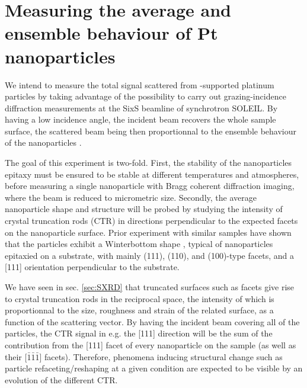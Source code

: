 \section{Measuring the average and ensemble behaviour of Pt nanoparticles}


We intend to measure the total signal scattered from -supported platinum particles by taking advantage of the possibility to carry out grazing-incidence diffraction measurements at the SixS beamline of synchrotron SOLEIL.
By having a low incidence angle, the incident beam recovers the whole sample surface, the scattered beam being then proportionnal to the ensemble behaviour of the nanoparticles \parencite{Nolte2008, Hejral2013}.

The goal of this experiment is two-fold.
First, the stability of the nanoparticles epitaxy must be ensured to be stable at different temperatures and atmospheres, before measuring a single nanoparticle with Bragg coherent diffraction imaging, where the beam is reduced to micrometric size.
Secondly, the average nanoparticle shape and structure will be probed by studying the intensity of crystal truncation rods (CTR) in directions perpendicular to the expected facets on the nanoparticle surface.
Prior experiment with similar samples \parencite{Dupraz2017, Li2020, Lim2021, Dupraz2022} have shown that the particles exhibit a Winterbottom shape \parencite{WINTERBOTTOM1967, Boukouvala2021}, typical of nanoparticles epitaxied on a substrate, with mainly (111), (110), and (100)-type facets, and a [111] orientation perpendicular to the substrate.

We have seen in sec. \ref{sec:SXRD} that truncated surfaces such as facets give rise to crystal truncation rods in the reciprocal space, the intensity of which is proportionnal to the size, roughness and strain of the related surface, as a function of the scattering vector.
By having the incident beam covering all of the particles, the CTR signal in e.g. the [111] direction will be the sum of the contribution from the [111] facet of every nanoparticle on the sample (as well as their [$\bar{1}\bar{1}\bar{1}$] facets).
Therefore, phenomena inducing structural change such as particle refaceting/reshaping at a given condition are expected to be visible by an evolution of the different CTR.


